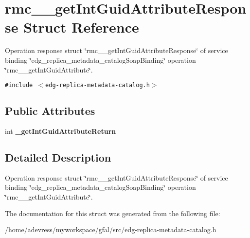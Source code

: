 \section{rmc\_\-\_\-get\-Int\-Guid\-Attribute\-Response Struct Reference}
\label{structrmc____getIntGuidAttributeResponse}
Operation response struct \char`\"{}rmc\_\-\_\-get\-Int\-Guid\-Attribute\-Response\char`\"{} of service binding \char`\"{}edg\_\-replica\_\-metadata\_\-catalog\-Soap\-Binding\char`\"{} operation \char`\"{}rmc\_\-\_\-get\-Int\-Guid\-Attribute\char`\"{}.  


{\tt \#include $<$edg-replica-metadata-catalog.h$>$}

\subsection*{Public Attributes}
\begin{CompactItemize}
\item 
int \textbf{\_\-get\-Int\-Guid\-Attribute\-Return}\label{structrmc____getIntGuidAttributeResponse_b68a3037f530903474a855911c17971c}

\end{CompactItemize}


\subsection{Detailed Description}
Operation response struct \char`\"{}rmc\_\-\_\-get\-Int\-Guid\-Attribute\-Response\char`\"{} of service binding \char`\"{}edg\_\-replica\_\-metadata\_\-catalog\-Soap\-Binding\char`\"{} operation \char`\"{}rmc\_\-\_\-get\-Int\-Guid\-Attribute\char`\"{}. 



The documentation for this struct was generated from the following file:\begin{CompactItemize}
\item 
/home/adevress/myworkspace/gfal/src/edg-replica-metadata-catalog.h\end{CompactItemize}
